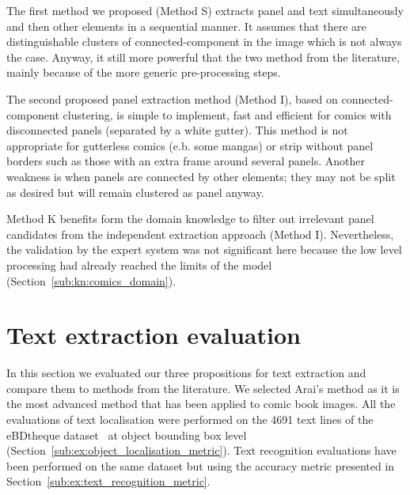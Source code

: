The first method we proposed (Method S) extracts panel and text simultaneously and then other elements in a sequential manner.
It assumes that there are distinguishable clusters of connected-component in the image which is not always the case.
Anyway, it still more powerful that the two method from the literature, mainly because of the more generic pre-processing steps.

The second proposed panel extraction method (Method I), based on connected-component clustering, is simple to implement, fast and efficient for comics with disconnected panels (separated by a white gutter).
This method is not appropriate for gutterless comics (e.b. some mangas) or strip without panel borders such as those with an extra frame around several panels.
Another weakness is when panels are connected by other elements; they may not be split as desired but will remain clustered as panel anyway.

Method K benefits form the domain knowledge to filter out irrelevant panel candidates from the independent extraction approach (Method I).
Nevertheless, the validation by the expert system was not significant here because the low level processing had already reached the limits of the model (Section~\ref{sub:kn:comics_domain}).






\section{Text extraction evaluation} %
\label{sub:ex:text_extraction_recognition_evaluation}

In this section we evaluated our three propositions for text extraction and compare them to methods from the literature.
We selected Arai's method as it is the most advanced method that has been applied to comic book images.
All the evaluations of text localisation were performed on the 4691 text lines of the eBDtheque dataset~\cite{Guerin2013} at object bounding box level (Section~\ref{sub:ex:object_localisation_metric}).
Text recognition evaluations have been performed on the same dataset but using the accuracy metric presented in Section~\ref{sub:ex:text_recognition_metric}.

